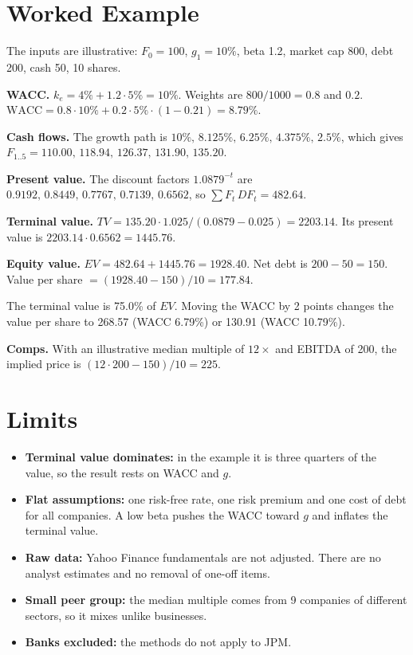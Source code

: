 \documentclass[11pt,a4paper]{article}
\begin{document}
\section{Worked Example}

The inputs are illustrative: $F_0=100$, $g_1=10\%$, beta 1.2, market cap 800, debt 200, cash 50, 10 shares.

\textbf{WACC.} $k_e=4\%+1.2\cdot5\%=10\%$. Weights are $800/1000=0.8$ and $0.2$. $\text{WACC}=0.8\cdot10\%+0.2\cdot5\%\cdot(1-0.21)=8.79\%$.

\textbf{Cash flows.} The growth path is $10\%,\,8.125\%,\,6.25\%,\,4.375\%,\,2.5\%$, which gives $F_{1..5}=110.00,\,118.94,\,126.37,\,131.90,\,135.20$.

\textbf{Present value.} The discount factors $1.0879^{-t}$ are $0.9192,\,0.8449,\,0.7767,\,0.7139,\,0.6562$, so $\sum F_t\,DF_t=482.64$.

\textbf{Terminal value.} $TV=135.20\cdot1.025/(0.0879-0.025)=2203.14$. Its present value is $2203.14\cdot0.6562=1445.76$.

\textbf{Equity value.} $EV=482.64+1445.76=1928.40$. Net debt is $200-50=150$. Value per share $=(1928.40-150)/10=177.84$.

The terminal value is 75.0\% of $EV$. Moving the WACC by 2 points changes the value per share to 268.57 (WACC 6.79\%) or 130.91 (WACC 10.79\%).

\textbf{Comps.} With an illustrative median multiple of $12\times$ and EBITDA of 200, the implied price is $(12\cdot200-150)/10=225$.

\section{Limits}

\begin{itemize}
\item \textbf{Terminal value dominates:} in the example it is three quarters of the value, so the result rests on WACC and $g$.
\item \textbf{Flat assumptions:} one risk-free rate, one risk premium and one cost of debt for all companies. A low beta pushes the WACC toward $g$ and inflates the terminal value.
\item \textbf{Raw data:} Yahoo Finance fundamentals are not adjusted. There are no analyst estimates and no removal of one-off items.
\item \textbf{Small peer group:} the median multiple comes from 9 companies of different sectors, so it mixes unlike businesses.
\item \textbf{Banks excluded:} the methods do not apply to JPM.
\end{itemize}
\end{document}
